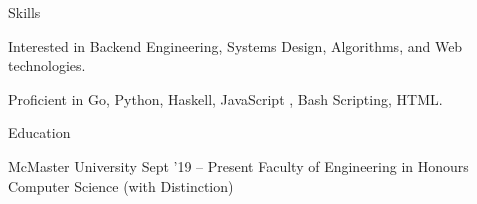 \documentclass{resume} %
\begin{document}

\begin{rSection}{Skills}
  \begin{rSkillsSection}
  {
    \item Interested in Backend Engineering, Systems Design, Algorithms, and Web technologies.
    \item  Proficient in Go, Python, Haskell, JavaScript , Bash Scripting, HTML.
  }
  \end{rSkillsSection}
\end{rSection}


\begin{rSection}{Education}
  \begin{rEducationSection}{McMaster University}
                           {Sept '19 -- Present}
                           {Faculty of Engineering in Honours Computer Science (with Distinction)}
  \end{rEducationSection}
\end{rSection}

\end{document}
